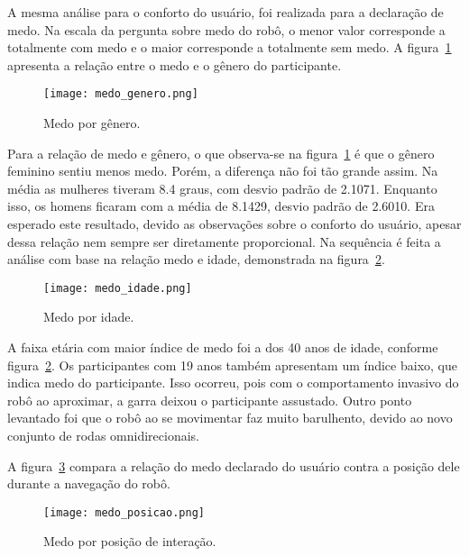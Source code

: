 A mesma análise para o conforto do usuário, foi realizada para a declaração de medo. Na escala da pergunta sobre medo do robô, o menor valor corresponde a totalmente com medo e o maior corresponde a totalmente sem medo. A figura~\ref{fig:medogenero} apresenta a relação entre o medo e o gênero do participante.

\begin{figure}[ht!]
	\centering
	\begin{minipage}{0.65\textwidth}
		\caption{Medo por gênero.}
		\texttt{[image: medo\_genero.png]}
		\label{fig:medogenero}
	\end{minipage}
\end{figure}

Para a relação de medo e gênero, o que observa-se na figura~\ref{fig:medogenero} é que o gênero feminino sentiu menos medo. Porém, a diferença não foi tão grande assim. Na média as mulheres tiveram 8.4 graus, com desvio padrão de 2.1071. Enquanto isso, os homens ficaram com a média de 8.1429, desvio padrão de 2.6010. Era esperado este resultado, devido as observações sobre o conforto do usuário, apesar dessa relação nem sempre ser diretamente proporcional. Na sequência é feita a análise com base na relação medo e idade, demonstrada na figura~\ref{fig:medoidade}.

\begin{figure}[ht!]
	\centering
	\begin{minipage}{0.65\textwidth}
		\caption{Medo por idade.}
		\texttt{[image: medo\_idade.png]}
		\label{fig:medoidade}
	\end{minipage}
\end{figure}

A faixa etária com maior índice de medo foi a dos 40 anos de idade, conforme figura~\ref{fig:medoidade}. Os participantes com 19 anos também apresentam um índice baixo, que indica medo do participante. Isso ocorreu, pois com o comportamento invasivo do robô ao aproximar, a garra deixou o participante assustado. Outro ponto levantado foi que o robô ao se movimentar faz muito barulhento, devido ao novo conjunto de rodas omnidirecionais.

A figura~\ref{fig:medoposicao} compara a relação do medo declarado do usuário contra a posição dele durante a navegação do robô.

\begin{figure}[ht!]
	\centering
	\begin{minipage}{0.65\textwidth}
		\caption{Medo por posição de interação.}
		\texttt{[image: medo\_posicao.png]}
		\label{fig:medoposicao}
	\end{minipage}
\end{figure}

